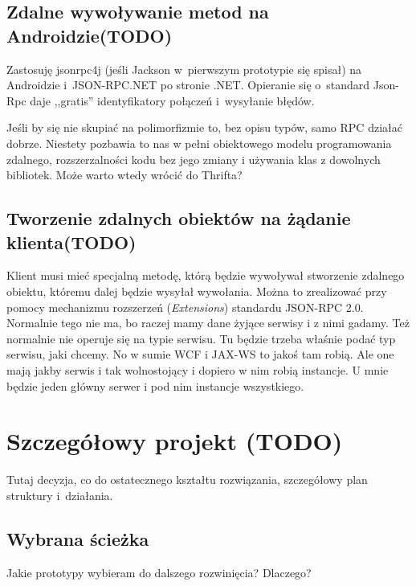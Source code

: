 \subsection{Zdalne wywoływanie metod na Androidzie(TODO)}
Zastosuję jsonrpc4j (jeśli Jackson w~pierwszym prototypie się spisał) na Androidzie i~JSON-RPC.NET po stronie .NET\@.
Opieranie się o~standard Json-Rpc daje ,,gratis'' identyfikatory połączeń i~wysyłanie błędów.

Jeśli by się nie skupiać na polimorfizmie to, bez opisu typów, samo RPC działać dobrze. Niestety pozbawia to nas w pełni obiektowego modelu programowania zdalnego, rozszerzalności kodu bez jego zmiany i używania klas z dowolnych bibliotek. Może warto wtedy wrócić do Thrifta? 

\subsection{Tworzenie zdalnych obiektów na żądanie klienta(TODO)}
Klient musi mieć specjalną metodę, którą będzie wywoływał stworzenie zdalnego obiektu, któremu dalej będzie wysyłał wywołania.
Można to zrealizować przy pomocy mechanizmu rozszerzeń (\emph{Extensions}) standardu JSON-RPC 2.0.
Normalnie tego nie ma, bo raczej mamy dane żyjące serwisy i z nimi gadamy. Też normalnie nie operuje się na typie serwisu. Tu będzie trzeba właśnie podać typ serwisu, jaki chcemy. No w sumie WCF i JAX-WS to jakoś tam robią. Ale one mają jakby serwis i tak wolnostojący i dopiero w nim robią instancje. U mnie będzie jeden główny serwer i pod nim instancje wszystkiego.


\section{Szczegółowy projekt (TODO)}
Tutaj decyzja, co do ostatecznego kształtu rozwiązania, szczegółowy plan struktury i~działania.

\subsection{Wybrana ścieżka}
Jakie prototypy wybieram do dalszego rozwinięcia?
Dlaczego?




